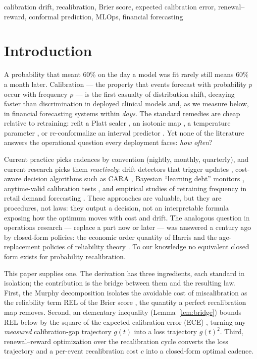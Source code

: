 \documentclass[conference]{IEEEtran}
\begin{document}
\begin{IEEEkeywords}
calibration drift, recalibration, Brier score, expected calibration error,
renewal--reward, conformal prediction, MLOps, financial forecasting
\end{IEEEkeywords}

\section{Introduction}
\label{sec:intro}

A probability that meant 60\% on the day a model was fit rarely still means
60\% a month later. Calibration --- the property that events forecast with
probability $p$ occur with frequency $p$ --- is the first casualty of
distribution shift, decaying faster than discrimination in deployed clinical
models \cite{davis2017drift,davis2020updating} and, as we measure below, in
financial forecasting systems within \emph{days}. The standard remedies are
cheap relative to retraining: refit a Platt scaler \cite{platt1999}, an
isotonic map \cite{zadrozny2002}, a temperature parameter \cite{guo2017}, or
re-conformalize an interval predictor \cite{vovk2005,gibbs2021}. Yet none of
the literature answers the operational question every deployment faces:
\emph{how often}?

Current practice picks cadences by convention (nightly, monthly, quarterly),
and current research picks them \emph{reactively}: drift detectors that
trigger updates \cite{davis2020updating}, cost-aware decision algorithms such
as CARA \cite{mahadevan2024cara}, Bayesian ``learning debt'' monitors
\cite{learningdebt2026}, anytime-valid calibration tests
\cite{anytimevalid2026}, and empirical studies of retraining frequency in
retail demand forecasting \cite{retrainfreq2025}. These approaches are
valuable, but they are procedures, not laws: they output a decision, not an
interpretable formula exposing how the optimum moves with cost and drift. The
analogous question in operations research --- replace a part now or later ---
was answered a century ago by closed-form policies: the economic order
quantity of Harris \cite{harris1913} and the age-replacement policies of
reliability theory \cite{barlow1965}. To our knowledge no equivalent
closed form exists for probability recalibration.

This paper supplies one. The derivation has three ingredients, each standard
in isolation; the contribution is the bridge between them and the resulting
law. First, the Murphy decomposition \cite{murphy1973} isolates the avoidable
cost of miscalibration as the reliability term $\mathrm{REL}$ of the Brier
score \cite{brier1950}, the quantity a perfect recalibration map removes.
Second, an elementary inequality (Lemma~\ref{lem:bridge}) bounds
$\mathrm{REL}$ below by the square of the expected calibration error (ECE)
\cite{naeini2015}, turning any \emph{measured} calibration-gap trajectory
$g(t)$ into a loss trajectory $g(t)^2$. Third, renewal--reward optimization
over the recalibration cycle converts the loss trajectory and a per-event
recalibration cost $c$ into a closed-form optimal cadence.
\end{document}
